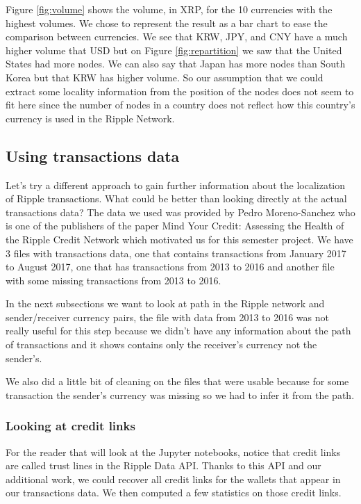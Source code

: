 Figure \ref{fig:volume} shows the volume, in XRP, for the 10 currencies with the highest volumes. We chose to represent the result as a bar chart to ease the comparison between currencies. We see that KRW, JPY, and CNY have a much higher volume that USD but on Figure \ref{fig:repartition} we saw that the United States had more nodes. We can also say that Japan has more nodes than South Korea but that KRW has higher volume. So our assumption that we could extract some locality information from the position of the nodes does not seem to fit here since the number of nodes in a country does not reflect how this country's currency is used in the Ripple Network.

\subsection{Using transactions data}
Let's try a different approach to gain further information about the localization of Ripple transactions. What could be better than looking directly at the actual transactions data? The data we used was provided by Pedro Moreno-Sanchez who is one of the publishers of the paper Mind Your Credit: Assessing the Health of the Ripple Credit Network\cite{MindYourCredit} which motivated us for this semester project. We have 3 files with transactions data, one that contains transactions from January 2017 to August 2017, one that has transactions from 2013 to 2016 and another file with some missing transactions from 2013 to 2016.

In the next subsections we want to look at path in the Ripple network and sender/receiver currency pairs, the file with data from 2013 to 2016 was not really useful for this step because we didn't have any information about the path of transactions and it shows contains only the receiver's currency not the sender's.

We also did a little bit of cleaning on the files that were usable because for some transaction the sender's currency was missing so we had to infer it from the path.

\subsubsection{Looking at credit links}
For the reader that will look at the Jupyter notebooks, notice that credit links are called trust lines in the Ripple Data API\cite{data-api}. Thanks to this API and our additional work, we could recover all credit links for the wallets that appear in our transactions data. We then computed a few statistics on those credit links.


